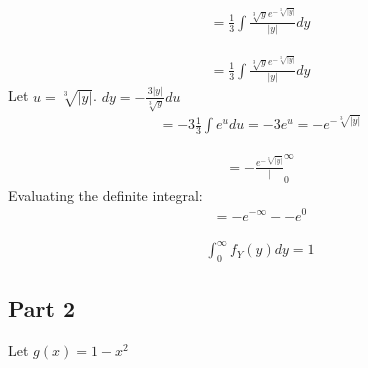 \documentclass{article}
\begin{document}
\begin{align*}
 = \frac{1}{3} \int \frac{\sqrt[3]{y} e^{-\sqrt[3]{|y|}}}{|y|} dy
\end{align*}

\begin{align*}
 = \frac{1}{3} \int \frac{\sqrt[3]{y} e^{-\sqrt[3]{|y|}}}{|y|} dy
\end{align*}
Let $u=\sqrt[3]{|y|}$. $dy = -\frac{3|y|}{\sqrt[3]{y}}du$
\begin{align*}
 = -3 \frac{1}{3} \int e^u du = -3e^u = -e^{-\sqrt[3]{|y|}}
\end{align*}

\begin{align*}
 = -\frac{e^{-\sqrt[3]{|y|}}} |_{0}^{\infty}
\end{align*}
Evaluating the definite integral:
\begin{align*}
 = -e^{-{\infty}} - -e^{0}
\end{align*}

\begin{align*}
\boxed{\int_{0}^{\infty} f_Y(y)dy = 1}
\end{align*}

\subsection*{Part 2}

Let $g(x)=1-x^2$
\end{document}
